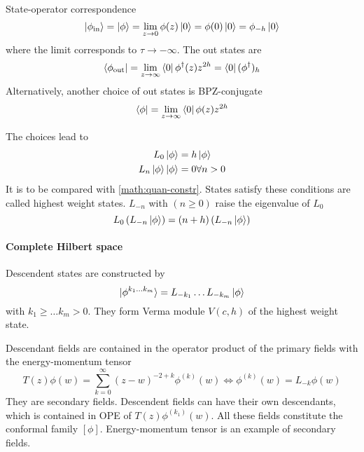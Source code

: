 \documentclass[12pt, a4paper, DIV=15]{article}
\numberwithin{equation}{section}
\begin{document}
State-operator correspondence
\begin{equation}
	\ket{\phi_\text{in}} = \ket{\phi} = \lim_{z\rightarrow 0 } \phi(z) \ket{0} = \phi(0) \ket{0} = \phi_{-h} \ket{0}
\end{equation}
where the limit corresponds to $\tau \rightarrow -\infty$. The out states are
\begin{equation}
	\bra{\phi_\text{out}} = \lim_{z\rightarrow \infty} \bra{0} \phi^\dagger(z) z^{2h} = \bra{0} (\phi^\dagger)_h
\end{equation}
Alternatively, another choice of out states is BPZ-conjugate
\begin{equation}
	\bra{\phi} = \lim_{z\rightarrow \infty} \bra{0} \phi(z)z^{2h}	
\end{equation}

The choices lead to
\begin{subequations}
\begin{align}
	L_0 \ket{\phi} &= h \ket{\phi} \\
	L_n \ket{\phi} \ket{\phi} &= 0 \forall n > 0
\end{align}
\end{subequations}
It is to be compared with \eqref{math:quan-constr}. States satisfy these conditions are called highest weight states. $L_{-n}$ with $(n \geq 0)$ raise the eigenvalue of $L_0$
\begin{equation}
	L_0 \left( L_{-n} \ket{\phi} \right) = (n + h) \left( L_{-n} \ket{\phi} \right)
\end{equation}

\paragraph{Complete Hilbert space} Descendent states are constructed by 
\begin{equation}
	\ket{\phi^{k_1\dots k_m}} = L_{-k_1} \dots L_{-k_m} \ket{\phi}
\end{equation}
with $k_1 \geq \dots k_m > 0$. They form Verma module $V(c,h)$ of the highest weight state.

Descendant fields are contained in the operator product of the primary fields with the energy-momentum tensor
\begin{equation}
	T(z) \phi(w) = \sum_{k=0}^{\infty} (z-w)^{-2+k} \phi^{(k)}(w) \Leftrightarrow \phi^{(k)}(w) = L_{-k} \phi(w)
\end{equation}
They are secondary fields. Descendent fields can have their own descendants, which is contained in OPE of $T(z) \phi^{(k_1)}(w)$. All these fields constitute the conformal family $[\phi]$. Energy-momentum tensor is an example of secondary fields.
\end{document}
